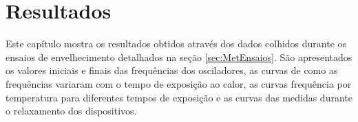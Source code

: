\chapter{Resultados}
\label{sec:Resultados}

Este capítulo mostra os resultados obtidos através dos dados colhidos durante os ensaios de envelhecimento detalhados na seção \ref{sec:MetEnsaios}. São apresentados os valores iniciais e finais das frequências dos osciladores, as curvas de como as frequências variaram com o tempo de exposição ao calor, as curvas frequência por temperatura para diferentes tempos de exposição e as curvas das medidas durante o relaxamento dos dispositivos.













